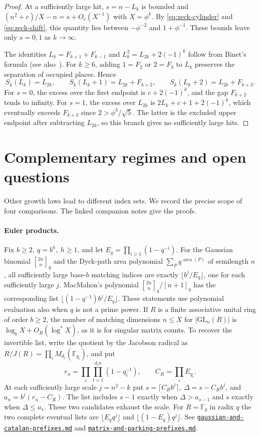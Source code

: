 \documentclass[11pt,reqno,a4paper]{amsart}
\theoremstyle{remark}
\newcommand{\companion}[1]{\href{../#1.md}{\nolinkurl{#1.md}}}
\begin{document}
\begin{proof}
At a sufficiently large hit, \(s=n-L_k\) is bounded and
\((n^2+c)/X-n=s+O_c(X^{-1})\) with \(X=\phi^k\).
By \eqref{eq:zeck-cylinder} and \eqref{eq:zeck-shift}, this quantity
lies between \(-\phi^{-2}\) and \(1+\phi^{-1}\).
These bounds leave only \(s=0,1\) as \(k\to\infty\).

The identities \(L_k=F_{k+1}+F_{k-1}\) and
\(L_k^2=L_{2k}+2(-1)^k\) follow from Binet's formula
(see also~\cite[\S2, (11) and Lemma~2.2]{zec-stoll}).
For \(k\ge6\), adding \(1=F_2\) or \(2=F_3\) to \(L_k\) preserves
the separation of occupied places. Hence
\[
 S_k(L_k)=L_{2k},\qquad S_k(L_k+1)=L_{2k}+F_{k+2},\qquad
 S_k(L_k+2)=L_{2k}+F_{k+3}.
\]
For \(s=0\), the excess over the first endpoint is \(c+2(-1)^k\),
and the gap \(F_{k+2}\) tends to infinity. For \(s=1\), the excess
over \(L_{2k}\) is \(2L_k+c+1+2(-1)^k\), which eventually exceeds
\(F_{k+3}\) since \(2>\phi^3/\sqrt5\). The latter is the excluded
upper endpoint after subtracting \(L_{2k}\), so this branch gives
no sufficiently large hits.
\end{proof}

\section{Complementary regimes and open questions}\label{sec:complements}

Other growth laws lead to different index sets. We record the precise
scope of four comparisons. The linked companion notes give the proofs.

\paragraph{Euler products.}
Fix \(b\ge2,\ q=b^h,\ h\ge1\), and let \(E_q=\prod_{i\ge1}(1-q^{-i})\).
For the Gaussian binomial \(\genfrac{[}{]}{0pt}{}{2n}{n}_{\!q}\) and the Dyck-path
area polynomial \(\sum_P q^{\operatorname{area}(P)}\) of semilength
\(n\), all sufficiently large base-\(b\) matching indices are exactly
\(\lfloor b^j/E_q\rfloor\), one for each sufficiently large \(j\).
MacMahon's polynomial \(\genfrac{[}{]}{0pt}{}{2n}{n}_{\!q}/[n+1]_q\) has the corresponding
list \(\lfloor(1-q^{-1})b^j/E_q\rfloor\). These statements use polynomial
evaluation also when \(q\) is not a prime power.
If \(R\) is a finite associative unital ring of order \(b\ge2\), the
number of matching dimensions \(n\le X\) for \(|\mathrm{GL}_n(R)|\)
is \(\log_b X+O_R(\log^* X)\), as it is for singular matrix counts.
To recover the invertible list, write the quotient by the Jacobson
radical as \(R/J(R)=\prod_i M_{d_i}(\mathbb F_{q_i})\), and put
\[
 r_n=\prod_i\prod_{t=1}^{d_i n}(1-q_i^{-t}),\qquad C_R=\prod_i E_{q_i}.
\]
At each sufficiently large scale \(j=n^2-k\) put
\(s=\lceil C_R b^j\rceil,\ \Delta=s-C_Rb^j\), and
\(a_n=b^j(r_n-C_R)\). The list includes \(s-1\) exactly when
\(\Delta>a_{s-1}\) and \(s\) exactly when \(\Delta\le a_s\).
These two candidates exhaust the scale.
For \(R=\mathbb F_q\) in radix \(q\) the two complete
eventual lists are \(\lfloor E_q q^j\rfloor\) and
\(\lfloor(1-E_q)q^j\rfloor\). See
\companion{gaussian-and-catalan-prefixes} and
\companion{matrix-and-parking-prefixes}.
\end{document}

